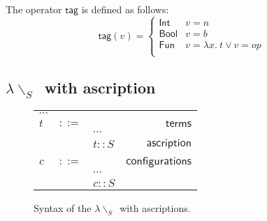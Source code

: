 \documentclass[preprint,authoryear,sort&compress,9pt,nocopyrightspace]{article}
\newcommand{\ascripS}[1]{#1::S}
\newcommand{\absST}[2]{\lambda #1. \ #2}
\newcommand{\lab}{\mathsf{tag}}
\newcommand{\boolt}{\mathsf{Bool}}
\newcommand{\intt}{\mathsf{Int}}
\newcommand{\funt}{\mathsf{Fun}}
\newcommand{\semanticB}{${\lambda}{\backslash}_S$}
\begin{document}
\begin{definition}[$\lab$]
\label{definition:tcs}
\mbox{}
The operator $\lab$ is defined  as follows:
\[ \lab(v) = \begin{cases} 
      \intt & v = n \\
      \boolt & v = b \\
      \funt & v = \absST{x}{t} \vee v = op\\
   \end{cases}
\]
\end{definition}







\subsection{\semanticB \ with ascription}

\begin{figure}[h]
\begin{small}
\begin{center}
\hspace*{-2cm}
\begin{tabular}{|l c l r|}
\hline
$\cdots$&&&\\
$t$&$::=$&&$\mathsf {terms}$\\
&&$\cdots$&\\
&&$\ascripS{t}$&$\mathsf {ascription}$\\
&&&\\
$c$&$::=$&&$\mathsf {configurations}$\\
&&$\cdots$&\\
&&$\ascripS{c}$&\\
\hline
\end{tabular}
\hspace*{-2cm}
\caption{Syntax of the \semanticB \ with ascriptions.}
\label{figure:SYNTAXASCRIP}
\end{center}
\end{small}
\end{figure}
\end{document}
